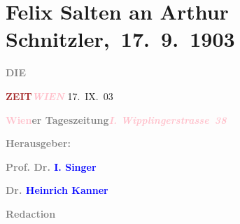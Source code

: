 

\renewcommand{\erwaehntePersonen}{Personen: Heinrich Kanner, Ottilie Salten, Olga Schnitzler, Heinrich Schnitzler, Isidor Singer}
\renewcommand{\erwaehnteInstitutionen}{Institutionen: Die Zeit}
\renewcommand{\erwaehnteOrte}{Orte: Edmund-Weiß-Gasse 7, Frankgasse 1, Wien, Wipplingerstraße, XVIII., Währing}
\renewcommand{\erwaehnteWerke}{}
\section[ Felix Salten an Arthur Schnitzler, 17. 9. 1903]{Felix Salten an Arthur Schnitzler, 17. 9. 1903}
\nopagebreak{}
\rehead{ }\normalsize\beginnumbering{}
\toendnotes[C]{\smallbreak\pagebreak[2]}
\toendnotes[C]{\smallbreak}
\pstart
           \noindent{}{\pb}\textcolor{gray}{\textbf{DIE}}\pend
           
\pstart
           \textcolor{gray}{\textbf{\textcolor{brown}{ZEIT}{}\ledrightnote{\textcolor{brown}{Die Zeit}}}}\hfill \textcolor{gray}{\textbf{\textcolor{pink}{\emph{WIEN}}{}\ledrightnote{\textcolor{pink}{Wien}}}}{ }17. IX. 03\pend
           
\pstart
           \textcolor{gray}{\textbf{\textcolor{pink}{Wien}{}\ledrightnote{\textcolor{pink}{Wien}}er Tageszeitung}}\hfill \textcolor{gray}{\textbf{\emph{\textcolor{pink}{I. Wipplingerstrasse 38}{}\ledrightnote{\textcolor{pink}{Wipplingerstraße}}}}}\pend
           
\pstart
           \textcolor{gray}{\textbf{Herausgeber:}}\pend
           
\pstart
           \textcolor{gray}{\textbf{\textbf{Prof. Dr. \textcolor{blue}{I. Singer}{}\ledrightnote{\textcolor{blue}{Isidor Singer}}}}}\pend
           
\pstart
           \textcolor{gray}{\textbf{\textbf{Dr. \textcolor{blue}{Heinrich Kanner}{}\ledrightnote{\textcolor{blue}{Heinrich Kanner}}}}}\pend
           
\pstart
           \textcolor{gray}{\textbf{\textbf{Redaction}}}\pend
           
